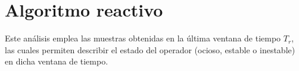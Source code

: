


\section{Algoritmo reactivo}


\normalsize{Este an\'alisis emplea las muestras obtenidas en la \'ultima ventana de tiempo $T_r$, las cuales permiten describir el estado del operador (ocioso, estable o inestable) en dicha ventana de tiempo.}


